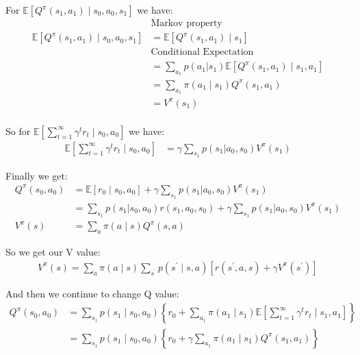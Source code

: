\documentclass[11pt]{article}
\begin{document}
For $\mathbb{E}\left[Q^\pi (s_1, a_1) \mid s_{0}, a_{0}, s_{1}\right]$  we have:
\begin{align*}
&\text{Markov property} \\
\mathbb{E}\left[Q^\pi (s_1, a_1) \mid s_{0}, a_{0}, s_{1}\right] &= \mathbb{E}\left[Q^\pi (s_1, a_1) \mid s_{1}\right] \\
&\text{Conditional Expectation} \\
&= \sum_{a_1}p(a_1 | s_1) \mathbb{E}\left[Q^\pi (s_1, a_1) \mid s_{1}, a_1\right] \\
&=\sum_{a_1} \pi(a_1 \mid s_1) Q^{\pi}(s_1, a_1) \quad \\
&= V^\pi(s_1) \\
\end{align*}

So for $\mathbb{E}\left[\sum_{t=1}^{\infty} \gamma^{t} r_{t} \mid s_{0}, a_{0}\right]$ we have:
\begin{align*}
\mathbb{E}\left[\sum_{t=1}^{\infty} \gamma^{t} r_{t} \mid s_{0}, a_{0}\right] &= \gamma\sum_{s_1} p(s_1 | a_0, s_0) V^{\pi}(s_1)
\end{align*}


Finally we get:
\begin{align*}
Q^{\pi}\left(s_{0}, a_{0}\right) &= \mathbb{E}\left[r_{0} \mid s_{0}, a_{0}\right] + \gamma\sum_{s_1} p(s_1 | a_0, s_0) V^{\pi}(s_1) \\
&= \sum_{s_1} p(s_1 | s_0, a_0)r(s_1,a_0,s_0) + \gamma\sum_{s_1} p(s_1 | a_0, s_0) V^{\pi}(s_1) \\
V^{\pi}(s) &=\sum_{a} \pi(a \mid s) Q^{\pi}(s, a) \quad
\end{align*}


So we get our V value:
\begin{align*}
V^{\pi}(s)=\sum_{a} \pi(a \mid s) \sum_{s^{\prime}} p\left(s^{\prime} \mid s, a\right)\left[r\left(s^{\prime}, a, s\right)+\gamma V^{\pi}\left(s^{\prime}\right)\right]
\end{align*}

And then we continue to change Q value:
\begin{align*}
Q^{\pi}\left(s_{0}, a_{0}\right) &=\sum_{s_{1}} p\left(s_{1} \mid s_{0}, a_{0}\right)\left\{r_{0}+\sum_{a_{1}} \pi\left(a_{1} \mid s_{1}\right) \mathbb{E}\left[\sum_{t=1}^{\infty} \gamma^{t} r_{t} \mid s_{1}, a_{1}\right]\right\} \\
&=\sum_{s_{1}} p\left(s_{1} \mid s_{0}, a_{0}\right)\left\{r_{0}+\gamma\sum_{a_{1}} \pi\left(a_{1} \mid s_{1}\right) Q^{\pi}\left(s_{1}, a_{1}\right)\right\}
\end{align*}
\end{document}
